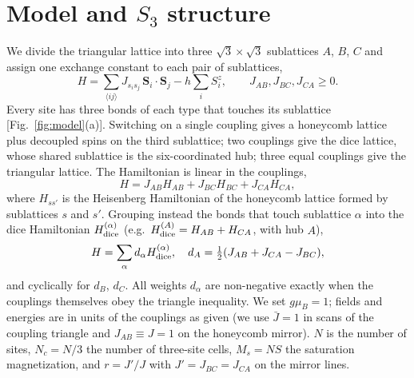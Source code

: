 \documentclass[prb,twocolumn,superscriptaddress,amsmath,amssymb,floatfix]{revtex4-2}
\newcommand{\Jb}{\bar J}
\begin{document}
\section{Model and $S_3$ structure}
\label{sec:model}

We divide the triangular lattice into three $\sqrt3\times\sqrt3$ sublattices $A$, $B$, $C$ and assign one exchange constant to each pair of sublattices,
\begin{equation}
H=\sum_{\langle ij\rangle}J_{s_is_j}\,\mathbf S_i\cdot\mathbf S_j-h\sum_i S_i^z ,\qquad J_{AB},J_{BC},J_{CA}\ge0 .
\label{eq:H}
\end{equation}
Every site has three bonds of each type that touches its sublattice [Fig.~\ref{fig:model}(a)]. Switching on a single coupling gives a honeycomb lattice plus decoupled spins on the third sublattice; two couplings give the dice lattice, whose shared sublattice is the six-coordinated hub; three equal couplings give the triangular lattice. The Hamiltonian is linear in the couplings,
\begin{equation}
H=J_{AB}H_{AB}+J_{BC}H_{BC}+J_{CA}H_{CA},
\label{eq:linear}
\end{equation}
where $H_{ss'}$ is the Heisenberg Hamiltonian of the honeycomb lattice formed by sublattices $s$ and $s'$. Grouping instead the bonds that touch sublattice $\alpha$ into the dice Hamiltonian $H^{(\alpha)}_{\rm dice}$ (e.g.\ $H^{(A)}_{\rm dice}=H_{AB}+H_{CA}$, with hub $A$),
\begin{equation}
H=\sum_\alpha d_\alpha H^{(\alpha)}_{\rm dice},\quad d_A=\tfrac12(J_{AB}+J_{CA}-J_{BC}),
\label{eq:dice}
\end{equation}
and cyclically for $d_B$, $d_C$. All weights $d_\alpha$ are non-negative exactly when the couplings themselves obey the triangle inequality. We set $g\mu_B=1$; fields and energies are in units of the couplings as given (we use $\Jb=1$ in scans of the coupling triangle and $J_{AB}\equiv J=1$ on the honeycomb mirror). $N$ is the number of sites, $N_c=N/3$ the number of three-site cells, $M_s=NS$ the saturation magnetization, and $r=J'/J$ with $J'=J_{BC}=J_{CA}$ on the mirror lines.
\end{document}
